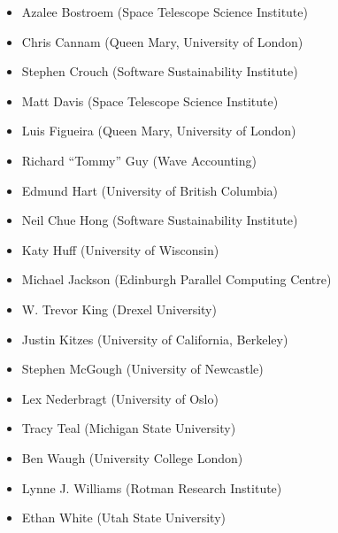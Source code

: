 \documentclass[10pt,a4paper,twocolumn]{article}
\begin{document}
\begin{itemize}
\item
  Azalee Bostroem (Space Telescope Science Institute)
\item
  Chris Cannam (Queen Mary, University of London)
\item
  Stephen Crouch (Software Sustainability Institute)
\item
  Matt Davis (Space Telescope Science Institute)
\item
  Luis Figueira (Queen Mary, University of London)
\item
  Richard ``Tommy'' Guy (Wave Accounting)
\item
  Edmund Hart (University of British Columbia)
\item
  Neil Chue Hong (Software Sustainability Institute)
\item
  Katy Huff (University of Wisconsin)
\item
  Michael Jackson (Edinburgh Parallel Computing Centre)
\item
  W. Trevor King (Drexel University)
\item
  Justin Kitzes (University of California, Berkeley)
\item
  Stephen McGough (University of Newcastle)
\item
  Lex Nederbragt (University of Oslo)
\item
  Tracy Teal (Michigan State University)
\item
  Ben Waugh (University College London)
\item
  Lynne J. Williams (Rotman Research Institute)
\item
  Ethan White (Utah State University)
\end{itemize}



\nocite{*}
{\small
}
\end{document}
